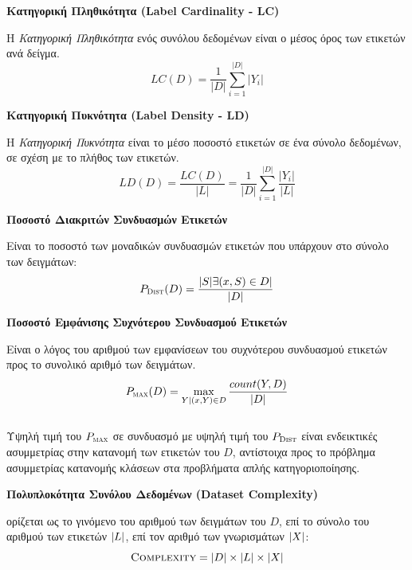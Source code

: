 \begin{description}
\item \textbf{Κατηγορική Πληθικότητα (Label Cardinality - LC)}

Η \emph{Κατηγορική Πληθικότητα} ενός συνόλου δεδομένων είναι ο μέσος όρος των ετικετών ανά δείγμα.
\begin{equation} 
LC(D)=\frac{1}{|D|} \sum_{i=1}^{|D|} |Y_i| 
\end{equation} 

\item \textbf{Κατηγορική Πυκνότητα (Label Density - LD)}

Η \emph{Κατηγορική Πυκνότητα} είναι το μέσο ποσοστό ετικετών σε ένα σύνολο δεδομένων, σε σχέση με το πλήθος των ετικετών.
\begin{equation} 
LD(D)= \frac{LC(D)}{|L|} =\frac{1}{|D|} \sum_{i=1}^{|D|} \frac{|Y_i|}{|L|} 
\end{equation} 

\item \textbf{Ποσοστό Διακριτών Συνδυασμών Ετικετών}

Είναι το ποσοστό των μοναδικών συνδυασμών ετικετών που υπάρχουν στο σύνολο των δειγμάτων: 
\begin{equation}
P_{\textsc{Dist}}(D)=\frac{\left|S|\exists(x,S) \in D \right|}{|D|} 
\end{equation}  

\item \textbf{Ποσοστό Εμφάνισης Συχνότερου Συνδυασμού Ετικετών}

Είναι ο λόγος του αριθμού των εμφανίσεων του συχνότερου συνδυασμού ετικετών προς το συνολικό αριθμό των δειγμάτων.
\begin{equation}
P_{\textsc{max}}(D)= \max_{Y|(x,Y) \in D} \frac{count(Y,D)}{|D|} 
\end{equation}
\\
Υψηλή τιμή του $P_{\textsc{max}}$ σε συνδυασμό με υψηλή τιμή του $P_{\textsc{Dist}}$ είναι ενδεικτικές ασυμμετρίας στην κατανομή των ετικετών του $D$, αντίστοιχα προς το πρόβλημα ασυμμετρίας κατανομής κλάσεων στα προβλήματα απλής κατηγοριοποίησης.

\item \textbf{Πολυπλοκότητα Συνόλου Δεδομένων (Dataset Complexity)}

ορίζεται ως το γινόμενο του αριθμού των δειγμάτων του $D$, επί το σύνολο του αριθμού των ετικετών $\lvert L\rvert$, επί τον αριθμό των γνωρισμάτων $\lvert X\rvert$:
\begin{equation}
\textsc{Complexity} = \lvert D\rvert \times \lvert L\rvert \times \lvert X\rvert
\end{equation}
\end{description}

